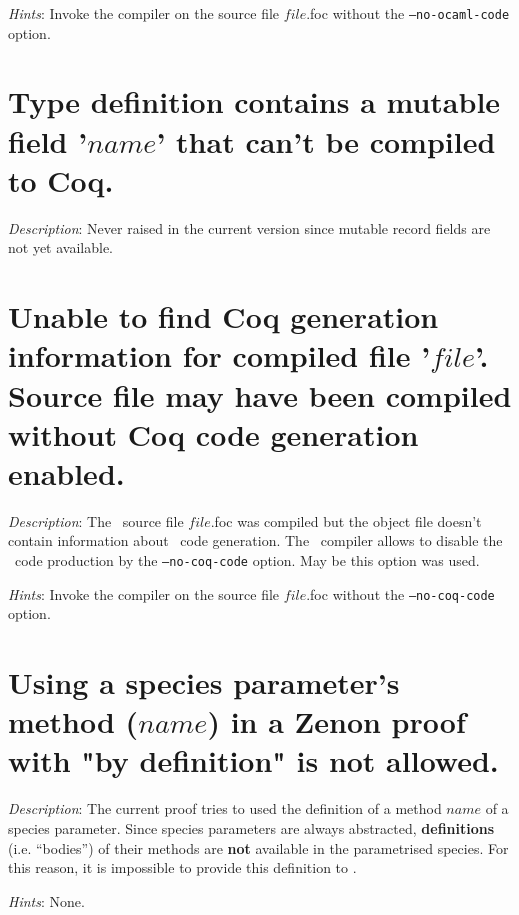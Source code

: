 {\em Hints}: Invoke the compiler on the source file $file$.foc without
the {\tt --no-ocaml-code} option.



\section*{Type definition contains a mutable field '$name$' that can't
  be compiled to Coq.}

{\em Description}: {\color{red} Never raised in the current version
  since mutable record fields are not yet available}.



\section*{Unable to find Coq generation information for compiled file
  '$file$'. Source file may have been compiled without Coq code
  generation enabled.}

{\em Description}: The \focal\ source file $file$.foc was compiled but
the object file doesn't contain information about \coq\ code
generation. The \focal\ compiler allows to disable the \coq\ code
production by the {\tt --no-coq-code} option. May be this option was used.

{\em Hints}: Invoke the compiler on the source file $file$.foc without
the {\tt --no-coq-code} option.



\section*{Using a species parameter's method ($name$) in a Zenon proof
  with "by definition" is not allowed.}

{\em Description}: The current proof tries to used the definition of a
method $name$ of a species parameter. Since species parameters are
always abstracted, {\bf definitions} (i.e. ``bodies'') of their methods
are {\bf not} available in the parametrised species. For this reason,
it is impossible to provide this definition to \zenon.

{\em Hints}: None.



